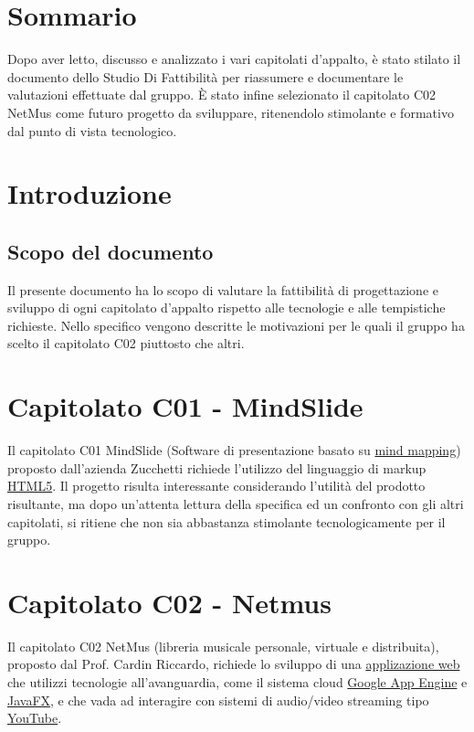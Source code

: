 \tableofcontents

\chapter*{Sommario}
\thispagestyle{fancy} %
Dopo aver letto, discusso e analizzato i vari capitolati d'appalto, \`e
stato stilato il documento dello Studio Di Fattibilit\`a per riassumere e
documentare le valutazioni effettuate dal gruppo. \`E stato infine selezionato
il capitolato C02 NetMus come futuro progetto da sviluppare, ritenendolo
stimolante e formativo dal punto di vista tecnologico.


\chapter{Introduzione}
\thispagestyle{fancy} %

\section{Scopo del documento}
Il presente documento ha lo scopo di valutare la fattibilit\`a di progettazione
e sviluppo di ogni capitolato d'appalto rispetto alle tecnologie e alle
tempistiche richieste. Nello specifico vengono descritte le motivazioni per le
quali il gruppo ha scelto il capitolato C02 piuttosto che altri.




\chapter{Capitolato C01 - MindSlide}
\thispagestyle{fancy}
Il capitolato C01 MindSlide (Software di presentazione basato su \underline{mind
mapping}) proposto dall'azienda Zucchetti richiede l'utilizzo del linguaggio di
markup \underline{HTML5}.
Il progetto risulta interessante considerando l'utilit\`a del prodotto
risultante, ma dopo un'attenta lettura della specifica ed un confronto con gli
altri capitolati, si ritiene che non sia abbastanza stimolante tecnologicamente
per il gruppo.

\chapter{Capitolato C02 - Netmus}
\thispagestyle{fancy}
Il capitolato C02 NetMus (libreria musicale personale, virtuale e distribuita),
proposto dal Prof. Cardin Riccardo, richiede lo sviluppo di una
\underline{applizazione web} che utilizzi tecnologie all'avanguardia, come il
sistema cloud \underline{Google App Engine} e \underline{JavaFX}, e che vada ad
interagire con sistemi di audio/video streaming tipo \underline{YouTube}.\\

